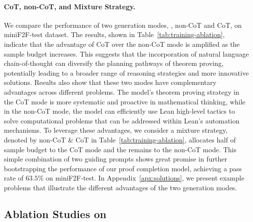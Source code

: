 \vspace{-0.1in}

\paragraph{CoT, non-CoT, and Mixture Strategy.}
We compare the performance of two generation modes, \ie, non-CoT and CoT, on miniF2F-test dataset.
The results, shown in Table~\ref{tab:training-ablation}, indicate that the advantage of CoT over the non-CoT mode is amplified as the sample budget increases.
This suggests that the incorporation of natural language chain-of-thought can diversify the planning pathways of theorem proving, potentially leading to a broader range of reasoning strategies and more innovative solutions.
Results also show that these two modes have complementary advantages across different problems.
The model's theorem proving strategy in the CoT mode is more systematic and proactive in mathematical thinking, while in the non-CoT mode, the model can efficiently use Lean high-level tactics to solve computational problems that can be addressed within Lean’s automation mechanisms.
To leverage these advantages, we consider a mixture strategy, denoted by non-CoT \& CoT in Table~\ref{tab:training-ablation}, allocates half of sample budget to the CoT mode and the remains to the non-CoT mode.
This simple combination of two guiding prompts shows great promise in further bootstrapping the performance of our proof completion model, achieving a pass rate of $63.5\%$ on miniF2F-test. In Appendix~\ref{apx:solutions}, we present example problems that illustrate the different advantages of the two generation modes.



\subsection{Ablation Studies on \treesearch} \label{sec:rmaxts-ablation}

